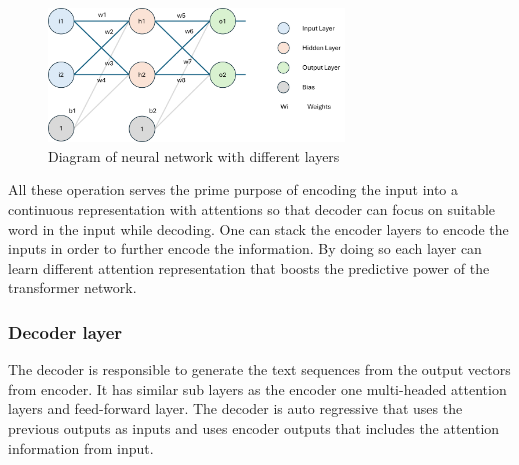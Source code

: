\begin{figure}[ht]
    \centering
    \includegraphics[width=0.7\textwidth]{chapters/images/Transformer/neuralnet.png}
    \caption{Diagram of neural network with different layers}
    \label{fig:neuralnet}
\end{figure}


All these operation serves the prime purpose of encoding the input into a continuous representation with attentions so that decoder can focus on suitable word in the input while decoding. One can stack the encoder layers to encode the inputs in order to further encode the information. By doing so each layer can learn different attention representation that boosts the predictive power of the transformer network. 

\subsubsection{Decoder layer}
The decoder is responsible to generate the text sequences from the output vectors from encoder. It has similar sub layers as the encoder one multi-headed attention layers and feed-forward layer. The decoder is auto regressive that uses the previous outputs as inputs and uses encoder outputs that includes the attention information from input.

